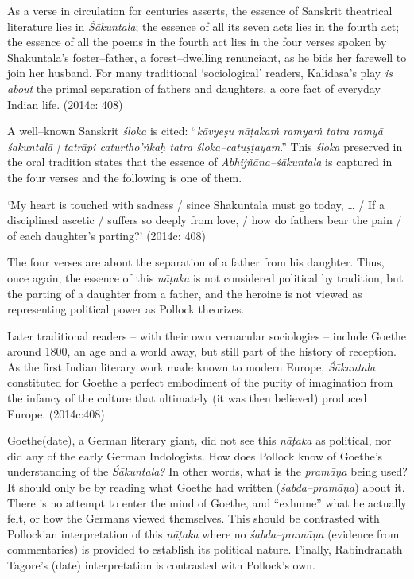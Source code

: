 \begin{myquote}
As a verse in circulation for centuries asserts, the essence of Sanskrit theatrical literature lies in \textit{Śākuntala}; the essence of all its seven acts lies in the fourth act; the essence of all the poems in the fourth act lies in the four verses spoken by Shakuntala’s foster–father, a forest–dwelling renunciant, as he bids her farewell to join her husband. For many traditional ‘sociological’ readers, Kalidasa’s play \textit{is about} the primal separation of fathers and daughters, a core fact of everyday Indian life. (2014c: 408)
\end{myquote}

A well–known Sanskrit \textit{śloka} is cited: “\textit{kāvyeṣu nāṭakaṁ ramyaṁ tatra ramyā śakuntalā | tatrāpi caturtho'ṅkaḥ tatra śloka–catuṣṭayam}.” This \textit{śloka} preserved in the oral tradition states that the essence of \textit{Abhijñāna–śākuntala }is captured in the four verses and the following is one of them.

\begin{myquote}
‘My heart is touched with sadness / since Shakuntala must go today, … / If a disciplined ascetic / suffers so deeply from love, / how do fathers bear the pain / of each daughter’s parting?’ (2014c: 408)
\end{myquote}

The four verses are about the separation of a father from his daughter. Thus, once again, the essence of this \textit{nāṭaka }is not considered political by tradition, but the parting of a daughter from a father, and the heroine is not viewed as representing political power as Pollock theorizes.

\begin{myquote}
Later traditional readers – with their own vernacular sociologies – include Goethe around 1800, an age and a world away, but still part of the history of reception. As the first Indian literary work made known to modern Europe, \textit{Śākuntala} constituted for Goethe a perfect embodiment of the purity of imagination from the infancy of the culture that ultimately (it was then believed) produced Europe. (2014c:408)
\end{myquote}

Goethe(date), a German literary giant, did not see this \textit{nāṭaka }as political, nor did any of the early German Indologists. How does Pollock know of Goethe’s understanding of the \textit{Śākuntala?} In other words, what is the \textit{pramāṇa} being used? It should only be by reading what Goethe had written (\textit{śabda–pramāṇa}) about it. There is no attempt to enter the mind of Goethe, and “exhume” what he actually felt, or how the Germans viewed themselves. This should be contrasted with Pollockian interpretation of this \textit{nāṭaka} where no \textit{śabda–pramāṇa }(evidence from commentaries) is provided to establish its political nature. Finally, Rabindranath Tagore’s (date) interpretation is contrasted with Pollock’s own.

